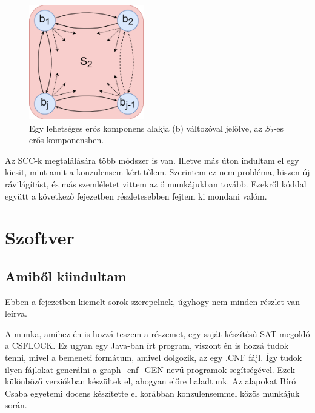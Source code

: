 \documentclass[
]{thesis-ekf}
\theoremstyle{definition}
\theoremstyle{remark}
\begin{document}
	\begin{figure}[h]
		\centering
		\includegraphics[width=5cm]{images/sajat_pelda-altalanos_scck_b}
		\caption{Egy lehetséges erős komponens alakja (b) változóval jelölve, az $ S_2 $-es erős komponensben.}
		\label{abra-sajatpelda-altalanos_scck_b-verzio}
	\end{figure}
	
	
	Az \textsc{SCC}-k megtalálására több módszer is van. Illetve más úton indultam el egy kicsit, mint amit a konzulensem kért tőlem. Szerintem ez nem probléma, hiszen új rávilágítást, és más szemléletet vittem az ő munkájukban tovább. Ezekről kóddal együtt a következő fejezetben részletesebben fejtem ki mondani valóm.
	
\chapter{Szoftver}
	\section{Amiből kiindultam}
	Ebben a fejezetben kiemelt sorok szerepelnek, úgyhogy nem minden részlet van leírva.
	
	A munka, amihez én is hozzá teszem a részemet, egy saját készítésű \textsc{SAT} megoldó a CSFLOCK. Ez ugyan egy Java-ban írt program, viszont én is hozzá tudok tenni, mivel a bemeneti formátum, amivel dolgozik, az egy .CNF fájl. Így tudok ilyen fájlokat generálni a graph\_cnf\_GEN nevű programok segítségével. Ezek különböző verziókban készültek el, ahogyan előre haladtunk. Az alapokat Bíró Csaba egyetemi docens készítette el korábban konzulensemmel közös munkájuk során.
	
\end{document}
